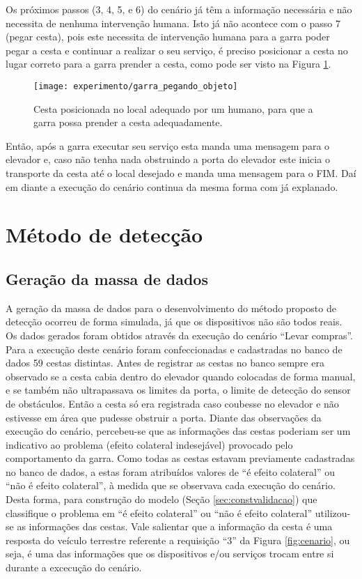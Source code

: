 Os próximos passos (3, 4, 5, e 6) do cenário já têm a informação necessária e não necessita de nenhuma intervenção humana. Isto já não acontece com o passo 7 (pegar cesta), pois este necessita de intervenção humana para a garra poder pegar a cesta e continuar a realizar o seu serviço, é preciso posicionar a cesta no lugar correto para a garra prender a cesta, como pode ser visto na Figura \ref{fig:garra_pegando_objeto}. \begin{figure}[!htb] \centering 
  \centering
  \texttt{[image: experimento/garra\_pegando\_objeto]} 
  \caption{Cesta posicionada no local adequado por um humano, para que a garra possa prender a cesta adequadamente.} 
  \label{fig:garra_pegando_objeto}
\end{figure} Então, após a garra executar seu serviço esta manda uma mensagem para o elevador e, caso não tenha nada obstruindo a porta do elevador este inicia o transporte da cesta até o local desejado e manda uma mensagem para o FIM. Daí em diante a execução do cenário continua da mesma forma com já explanado.

\section{Método de detecção}
\subsection{Geração da massa de dados}
\label{subsec:geracaodados}
A geração da massa de dados para o desenvolvimento do método proposto de detecção ocorreu de forma simulada, já que os dispositivos não são todos reais. Os dados gerados foram obtidos através da execução do cenário ``Levar compras''. Para a execução deste cenário foram confeccionadas e cadastradas no banco de dados 59 cestas distintas. Antes de registrar as cestas no banco sempre era observado se a cesta cabia dentro do elevador quando colocadas de forma manual, e se também não ultrapassava os limites da porta, o limite de detecção do sensor de obstáculos. Então a cesta só era registrada caso coubesse no elevador e não estivesse em área que pudesse obstruir a porta. Diante das observações da execução do cenário, percebeu-se que as informações das cestas poderiam ser um indicativo ao problema (efeito colateral indesejável) provocado pelo comportamento da garra. Como todas as cestas estavam previamente cadastradas no banco de dados, a estas foram atribuídos valores de ``é efeito colateral'' ou ``não é efeito colateral'', à medida que se observava cada execução do cenário. Desta forma, para construção do modelo (Seção \ref{sec:constvalidacao}) que classifique o problema em ``é efeito colateral'' ou ``não é efeito colateral'' utilizou-se as informações das cestas. Vale salientar que a informação da cesta é uma resposta do veículo terrestre referente a requisição ``3'' da Figura \ref{fig:cenario}, ou seja, é uma das informações que os dispositivos e/ou serviços trocam entre si durante a excecução do cenário.

